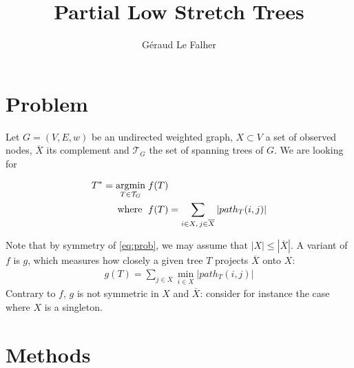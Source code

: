 \documentclass[a4paper,final,notitlepage,11pt,svgnames]{scrartcl}
\title{Partial Low Stretch Trees}
\author{Géraud Le Falher}
\newcommand{\stcomp}[1]{\ensuremath{\overline{#1}}}
\newcommand{\allst}{\ensuremath{\mathcal{T}_G}}
\begin{document}
\maketitle

\section*{Problem}

Let $G=(V,E,w)$ be an undirected weighted graph, $X \subset V$ a set of observed
nodes, $\stcomp{X}$ its complement and \allst{} the set of spanning
trees of $G$. We are looking for

\begin{align}
	T^* = \argmin_{T \in \mathcal{T}_G} \; & f(T) \notag \\
	\text{where }\; & f(T) = \sum_{i \in X ,\,j \in \stcomp{X}} \left| path_T(i, j) \right |
	\label{eq:prob}
\end{align}

Note that by symmetry of \eqref{eq:prob}, we may assume that $|X| \leq
\left| \stcomp{X}\right|$. A variant of $f$ is $g$, which measures how closely
a given tree $T$ projects $\stcomp{X}$ onto $X$:
\begin{align}
	g(T)= \sum_{j \in \stcomp{X}} \min_{i \in X} \left| path_T(i, j) \right |
\end{align}
Contrary to $f$, $g$ is not symmetric in $X$ and $\stcomp{X}$: consider for
instance the case where $X$ is a singleton.

\section*{Methods}
\end{document}
